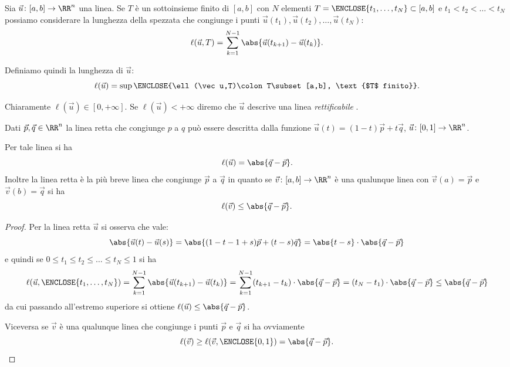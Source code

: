     \begin{definition}
    Sia $\vec u\colon[a,b]\to \RR^n$ una linea.
    Se $T$ è un sottoinsieme finito di $[a,b]$ con $N$ elementi 
    $T=\ENCLOSE{t_1, \dots, t_N}\subset [a,b]$ e $t_1< t_2 < \dots < t_N$
    possiamo considerare la lunghezza della spezzata che congiunge 
    i punti $\vec u(t_1), \vec u(t_2), \dots, \vec u(t_N)$:
    \[
    \ell(\vec u, T) = \sum_{k=1}^{N-1} \abs{\vec u(t_{k+1})-\vec u(t_k)}.  
    \]
    
    Definiamo quindi la lunghezza di $\vec u$:
    \[
    \ell(\vec u) = \sup\ENCLOSE{\ell(\vec u,T)\colon T\subset [a,b], \text{$T$ finito}}.  
    \]
    
    Chiaramente $\ell(\vec u) \in [0,+\infty]$.
    Se $\ell(\vec u)<+\infty$ diremo che $\vec u$ descrive una linea 
    \emph{rettificabile}%
    .
    \end{definition}
    
    \begin{theorem}
    Dati $\vec p, \vec q\in \RR^n$ la linea retta che congiunge 
    $p$ a $q$ può essere descritta dalla funzione 
    $\vec u(t) = (1-t) \vec p + t \vec q$, $\vec u\colon[0,1]\to \RR^n$.
    
    Per tale linea si ha 
    \[
     \ell(\vec u) = \abs{\vec q- \vec p}.
    \]
    Inoltre la linea retta è la più breve linea che congiunge $\vec p$ a $\vec q$ 
    in quanto se $\vec v\colon[a,b]\to \RR^n$ è una qualunque linea con 
    $\vec v(a)=\vec p$ e $\vec v(b)=\vec q$ si ha 
    \[
    \ell(\vec v) \le \abs{\vec q-\vec p}.  
    \]
    \end{theorem}
    \begin{proof}
    Per la linea retta $\vec u$ si osserva che vale:
    \[
      \abs{\vec u(t)-\vec u(s)} 
      = \abs{(1-t - 1+s)\vec p + (t-s)\vec q}
      = \abs{t-s}\cdot \abs{\vec q - \vec p}
    \]
    e quindi se $0\le t_1\le t_2\le \dots \le t_N \le 1$ si ha
    \[
      \ell(\vec u, \ENCLOSE{t_1,\dots,t_N}) = 
      \sum_{k=1}^{N-1} \abs{\vec u(t_{k+1}) - \vec u(t_k)}
      = \sum_{k=1}^{N-1} (t_{k+1}-t_k)\cdot \abs{\vec q-\vec p}
      = (t_N-t_1)\cdot \abs{\vec q-\vec p}
      \le \abs{\vec q-\vec p}
    \]
    da cui passando all'estremo superiore si ottiene 
    $\ell(\vec u)\le \abs{\vec q -\vec p}$. 
    
    Viceversa se $\vec v$ è una qualunque linea che congiunge 
    i punti $\vec p$ e $\vec q$ si ha ovviamente 
    \[
      \ell(\vec v) \ge \ell(\vec v,\ENCLOSE{0,1}) = \abs{\vec q - \vec p}.
    \]
    \end{proof}
    
